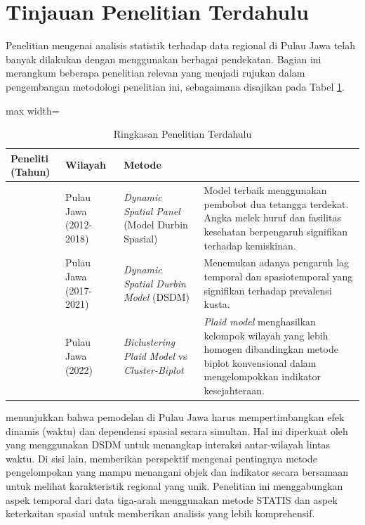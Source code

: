\section{\normalsize Tinjauan Penelitian Terdahulu}

Penelitian mengenai analisis statistik terhadap data regional di Pulau Jawa telah banyak dilakukan dengan menggunakan berbagai pendekatan. Bagian ini merangkum beberapa penelitian relevan yang menjadi rujukan dalam pengembangan metodologi penelitian ini, sebagaimana disajikan pada Tabel \ref{tab:penelitian-terdahulu}.

\begin{table}[H]
\centering
\small
\caption{Ringkasan Penelitian Terdahulu}\label{tab:penelitian-terdahulu}
\begin{adjustbox}{max width=\textwidth}
\begin{tabular}{|>{\centering\arraybackslash}m{2.2cm}|>{\centering\arraybackslash}m{2.2cm}|>{\centering\arraybackslash}m{3cm}|>{\raggedright\arraybackslash}m{6cm}|}
\hline
\textbf{Peneliti (Tahun)} & \textbf{Wilayah} & \textbf{Metode} & \multicolumn{1}{c|}{\textbf{Hasil Utama}} \\ \hline
\citet{nuswantari2021} & Pulau Jawa (2012-2018) & \textit{Dynamic Spatial Panel} (Model Durbin Spasial) & Model terbaik menggunakan pembobot dua tetangga terdekat. Angka melek huruf dan fasilitas kesehatan berpengaruh signifikan terhadap kemiskinan. \tabularnewline \hline
\citet{ahmad2024} & Pulau Jawa (2017-2021) & \textit{Dynamic Spatial Durbin Model} (DSDM) & Menemukan adanya pengaruh lag temporal dan spasiotemporal yang signifikan terhadap prevalensi kusta. \tabularnewline \hline
\citet{alfia2024} & Pulau Jawa (2022) & \textit{Biclustering Plaid Model} vs \textit{Cluster-Biplot} & \textit{Plaid model} menghasilkan kelompok wilayah yang lebih homogen dibandingkan metode biplot konvensional dalam mengelompokkan indikator kesejahteraan. \tabularnewline \hline
\end{tabular}
\end{adjustbox}
\end{table}

\citet{nuswantari2021} menunjukkan bahwa pemodelan di Pulau Jawa harus mempertimbangkan efek dinamis (waktu) dan dependensi spasial secara simultan. Hal ini diperkuat oleh \citet{ahmad2024} yang menggunakan DSDM untuk menangkap interaksi antar-wilayah lintas waktu. Di sisi lain, \citet{alfia2024} memberikan perspektif mengenai pentingnya metode pengelompokan yang mampu menangani objek dan indikator secara bersamaan untuk melihat karakteristik regional yang unik. Penelitian ini menggabungkan aspek temporal dari data tiga-arah menggunakan metode STATIS dan aspek keterkaitan spasial untuk memberikan analisis yang lebih komprehensif.

